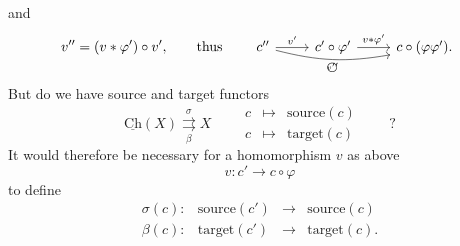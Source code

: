 \documentclass[11pt]{article}
\newcommand{\uCh}{\underline{\mathrm{Ch}}}
\newcommand{\circled}[1]{\text{\textcircled{$\scriptstyle #1$}}}
\begin{document}
and
\[
v''=(v*\varphi')\circ v', \qquad \text{thus} \qquad
\begin{tikzcd}
c'' \arrow[r, "v'"] \arrow[rr, bend right=12, "\circled{v''}"'] & c'\circ\varphi' \arrow[r, "v*\varphi'"] & c\circ(\varphi\varphi').
\end{tikzcd}
\]
But do we have source and target functors
\[
\uCh(X) \overset{\sigma}{\underset{\beta}{\rightrightarrows}} X \qquad
\begin{array}{ccl}
c & \longmapsto & \text{source}(c)\\[1ex]
c & \longmapsto & \text{target}(c)
\end{array}
\qquad ?
\]
It would therefore be necessary for a homomorphism $v$ as above
\[
v : c' \longrightarrow c\circ\varphi
\]
to define
\[
\begin{array}{lrcl}
\sigma(c) : & \text{source}(c') & \longrightarrow & \text{source}(c)\\[1ex]
\beta(c) : & \text{target}(c') & \longrightarrow & \text{target}(c).
\end{array}
\]
\end{document}
